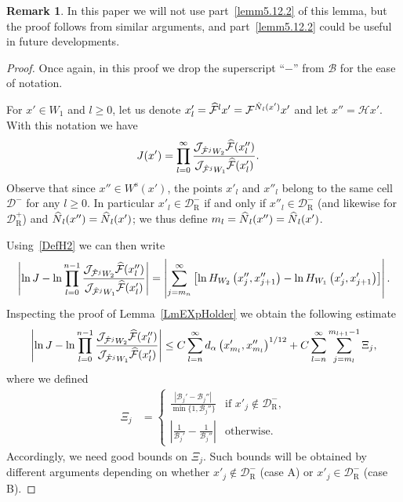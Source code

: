 \documentclass[10pt]{amsart}
\theoremstyle{definition}\newtheorem{defi}[theo]{Definition}\newtheorem{rema}[theo]{Remark}\newtheorem{exam}[theo]{Example}\newtheorem{exem}[theo]{Example}\newtheorem{nota}[theo]{Notation}
\newcommand{\nin}{\not\in}
\newcommand{\stable}{\text{s}}
\newcommand{\cB}{\mathcal{B}}
\newcommand{\pslope}{\mathcal{B}}
\newcommand{\cm}{\mathcal{F}}
\newcommand{\cell}{\mathcal{D}}
\newcommand{\hol}{\mathcal{H}}
\newcommand{\cmp}{\hat\cm}
\newcommand{\recoPrivate}{\mathrm{R}}
\newcommand{\reco}{{\cell^-_{\recoPrivate}}}
\newcommand{\backReco}{{\cell^+_{\recoPrivate}}}
\newcommand{\Ws}{W^{\stable}}
\newcommand{\ppPrivate}[2]{#1^{#2}}
\newcommand{\prePrivate}[1]{\ppPrivate{#1}{-}}
\newcommand{\prpslope}{\prePrivate{\pslope}}
\newcommand{\Np}{\hat N}
\newcommand{\jac}[1]{\mathcal{J}_{#1}}
\renewcommand{\prpslope}{\cB}
\renewcommand{\prpslope}{\cB}
\renewcommand{\prpslope}{\cB}
\newcommand{\slopeDifference}{\Xi}
\let\oldhat\hat
\renewcommand*{\hat}[1]{\mathchoice{\widehat{#1}}{\widehat{#1}}{\oldhat{#1}}{\oldhat{#1}}}
\begin{document}
\begin{rema}
In this paper we will not use part~\eqref{lemm5.12.2} of this lemma, but the proof follows from similar arguments, and part~\eqref{lemm5.12.2} could be useful in future developments.
\end{rema}
\begin{proof}
Once again, in this proof we drop the superscript ``$-$'' from $\cB$ for the ease of notation.


For $x'\in W_1$ and $l\ge0$, let us denote $x'_l = \cmp^l x'=\cm^{\Np_{l}(x')} x'$ and let $x''=\hol x'$. With this notation we have
\begin{align*}
J(x') &=\prod_{l = 0}^{\infty}
\frac{\jac{\cmp^{j}W_{2}}\cmp(x_l'')}{\jac{\cmp^{j}W_{1}}\cmp(x'_l)}.
\end{align*}
Observe that since $x''\in \Ws(x')$, the points $x'_l$ and $x''_l$ belong to the same cell $\cell^{-}$ for any $l \ge0 $. In particular $x'_l\in\reco$ if and only if $x''_l\in\reco$ (and likewise for $\backReco$) and $\Np_{l}(x'') = \Np_{l}(x')$; we thus define $m_{l} = \Np_{l}(x'') = \Np_{l}(x')$.

Using~\eqref{DefH2} we can then write
\begin{align*}
\left|\ln J-\ln \prod_{l=0}^{n-1} \frac{\jac{\cmp^{j}W_{2}}\cmp(x_l'')}{\jac{\cmp^{j}W_{1}}\cmp(x'_l)}\right| =\left|\sum_{j=m_n}^{\infty} \left[\ln H_{W_{2}}\left(x_j'', x_{j+1}''\right)-\ln H_{W_{1}}\left(x_j', x_{j+1}'\right)\right]\right|.
\end{align*}
Inspecting the proof of Lemma~\ref{LmEXpHolder} we obtain the following estimate
\begin{align}\label{UBJak}
\left|\ln J-\ln \prod_{l=0}^{n-1} \frac{\jac{\cmp^{j}W_{2}}\cmp(x_l'')}{\jac{\cmp^{j}W_{1}}\cmp(x'_l)}\right|
\leq C \sum_{l=n}^{\infty} d_\alpha\left(x_{m_l}', x_{m_l}''\right)^{1/12}+ C \sum_{l=n}^{\infty} \sum_{j=m_l}^{m_{l+1}-1} \slopeDifference_j,
\end{align}
where we defined
\begin{align*}
\slopeDifference_j &=
\begin{cases}
\displaystyle
\frac{|\prpslope_j'-\prpslope_j''|}{\min\{1,\prpslope_j''\}} &\text{if }x'_j\nin\reco, \\[5pt]
\displaystyle
\left|\frac{1}{\prpslope_j'}-\frac{1}{\prpslope_j''}\right| &\text{otherwise}.
\end{cases}
\end{align*}
Accordingly, we need good bounds on $\slopeDifference_j$. Such bounds will be obtained by different arguments depending on whether $x'_{j}\nin\reco$ (case A) or $x'_{j}\in\reco$ (case B).



\end{proof}
\end{document}
